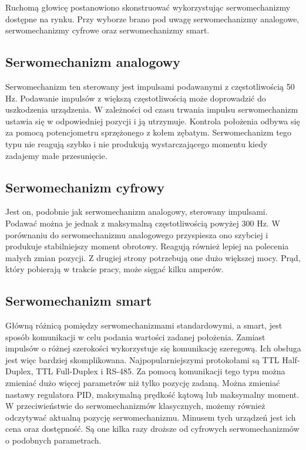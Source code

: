 Ruchomą głowicę postanowiono skonstruować wykorzystując serwomechanizmy dostępne na rynku. Przy wyborze brano pod uwagę serwomechanizmy analogowe, serwomechanizmy cyfrowe oraz serwomechanizmy smart.

\subsection{Serwomechanizm analogowy}
Serwomechanizm ten sterowany jest impulsami podawanymi z częstotliwością 50 Hz. Podawanie impulsów z większą częstotliwością może doprowadzić do uszkodzenia urządzenia. W zależności od czasu trwania impulsu serwomechanizm ustawia się w odpowiedniej pozycji i ją utrzymuje. Kontrola położenia odbywa się za pomocą potencjometru sprzężonego z kołem zębatym. Serwomechanizm tego typu nie reagują szybko i nie produkują wystarczającego momentu kiedy zadajemy małe przesunięcie.

\subsection{Serwomechanizm cyfrowy}
Jest on, podobnie jak serwomechanizm analogowy, sterowany impulsami. Podawać można je jednak z maksymalną częstotliwością powyżej 300 Hz. W porównaniu do serwomechanizmu analogowego przyspiesza ono szybciej i produkuje stabilniejszy moment obrotowy. Reagują również lepiej na polecenia małych zmian pozycji. Z drugiej strony  potrzebują one dużo większej mocy. Prąd, który pobierają w trakcie pracy, może sięgać kilku amperów.

\subsection{Serwomechanizm smart}
Główną różnicą pomiędzy serwomechanizmami standardowymi, a smart, jest sposób komunikacji w celu podania wartości zadanej położenia. Zamiast impulsów o różnej szerokości wykorzystuje się komunikację szeregową. Ich obsługa jest więc bardziej skomplikowana. Najpopularniejszymi protokołami są TTL Half-Duplex, TTL Full-Duplex i RS-485. Za pomocą komunikacji tego typu można zmieniać dużo więcej parametrów niż tylko pozycję zadaną. Można zmieniać nastawy regulatora PID, maksymalną prędkość kątową lub maksymalny moment. W przeciwieństwie do serwomechanizmów klasycznych, możemy również odczytywać aktualną pozycję serwomechanizmu. Minusem tych urządzeń jest ich cena oraz dostępność. Są one kilka razy droższe od cyfrowych serwomechanizmów o podobnych parametrach.

